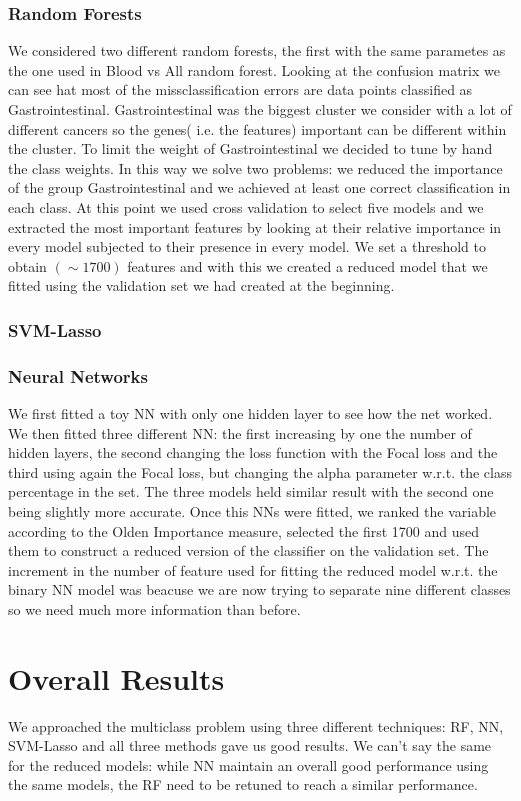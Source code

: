 \documentclass[a4paper,11pt, oneside]{article}  %
\begin{document}
\subsubsection{Random Forests}
We considered two different random forests, the first with the same parametes as the one used in Blood vs All random forest. Looking at the confusion matrix we can see hat most of the missclassification errors are data points classified as Gastrointestinal. Gastrointestinal was the biggest cluster we consider with a lot of different cancers so the genes( i.e. the features) important can be different within the cluster. To limit the weight of Gastrointestinal we decided to tune by hand the class weights. In this way we solve two problems: we reduced the importance of the group Gastrointestinal and we achieved at least one correct classification in each class. At this point we used cross validation to select five models and we extracted the most important features by looking at their relative importance in every model subjected to their presence in every model. We set a threshold to obtain  $(\sim   1700)$ features and with this we created a reduced model that we fitted using the validation set we had created at the beginning.
\subsubsection{SVM-Lasso}

\subsubsection{Neural Networks}
We first fitted a toy NN with only one hidden layer to see how the net worked.
We then fitted three different NN: the first increasing by one the number of hidden layers, the second changing the loss function with the Focal loss and the third using again the Focal loss, but changing the alpha parameter w.r.t. the class percentage in the set.
The three models held similar result with the second one being slightly more accurate. Once this NNs were fitted, we ranked the variable according to the Olden Importance measure, selected the first 1700 and used them to construct a reduced version of the classifier on the validation set.
The increment in the number of feature used for fitting the reduced model w.r.t. the binary NN model was beacuse we are now trying to separate nine different classes so we need much more information than before.

\section{Overall Results}
We approached the multiclass problem using three different techniques: RF, NN, SVM-Lasso and all three methods gave us good results. We can't say the same for the reduced models: while NN maintain an overall good performance using the same models, the RF need to be retuned to reach a similar performance. 
\end{document}
